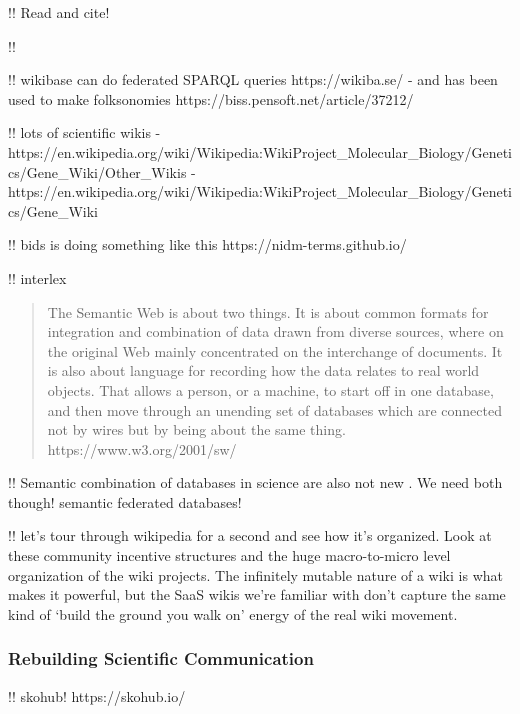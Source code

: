 \documentclass[10pt]{article}
\begin{document}
\begin{multicols}{2}
\cite{kamelboulosSemanticWikisComprehensible2009} 

!! Read and cite! \cite{classeDistributedInfrastructureSupport2017} 

!! \cite{goodSocialTaggingLife2009} 

!! wikibase can do federated SPARQL queries https://wikiba.se/ - and has
been used to make folksonomies https://biss.pensoft.net/article/37212/

!! lots of scientific wikis -
https://en.wikipedia.org/wiki/Wikipedia:WikiProject\_Molecular\_Biology/Genetics/Gene\_Wiki/Other\_Wikis
-
https://en.wikipedia.org/wiki/Wikipedia:WikiProject\_Molecular\_Biology/Genetics/Gene\_Wiki

!! bids is doing something like this https://nidm-terms.github.io/

!! interlex

\begin{quote}
The Semantic Web is about two things. It is about common formats for
integration and combination of data drawn from diverse sources, where on
the original Web mainly concentrated on the interchange of documents. It
is also about language for recording how the data relates to real world
objects. That allows a person, or a machine, to start off in one
database, and then move through an unending set of databases which are
connected not by wires but by being about the same thing.
https://www.w3.org/2001/sw/
\end{quote}

!! Semantic combination of databases in science are also not new \cite{cheungSemanticWebApproach2007, simaEnablingSemanticQueries2019} .
We need both though! semantic federated databases!

!! let's tour through wikipedia for a second and see how it's organized.
Look at these community incentive structures and the huge macro-to-micro
level organization of the wiki projects. The infinitely mutable nature
of a wiki is what makes it powerful, but the SaaS wikis we're familiar
with don't capture the same kind of `build the ground you walk on'
energy of the real wiki movement.

\hypertarget{rebuilding-scientific-communication}{%
\subsubsection{Rebuilding Scientific
Communication}\label{rebuilding-scientific-communication}}

!! skohub! https://skohub.io/


\end{multicols}
\end{document}
